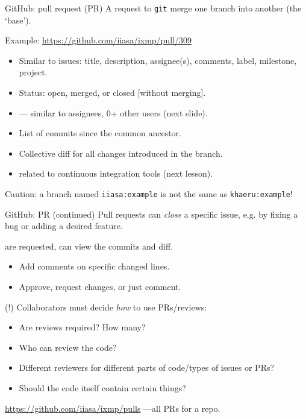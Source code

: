 \documentclass[12pt,aspectratio=169]{beamer}
\begin{document}
\begin{frame}{GitHub: pull request (PR)}
A request to \texttt{git} merge one branch into another (the ‘base’).

\bigskip
Example: \url{https://github.com/iiasa/ixmp/pull/309}

\bigskip
\begin{itemize}
  \item Similar to issues: title, description, assignee(s), comments, label, milestone, project.
  \item Status: open, merged, or closed [without merging].
  \item {} — similar to assignees, 0+ other users (next slide).
  \item List of commits since the common ancestor.
  \item Collective diff for all changes introduced in the branch.
  \item {} related to continuous integration tools (next lesson).
\end{itemize}

\alert{Caution:} a branch named \texttt{iiasa:example} is not the same as
\texttt{khaeru:example}!

\end{frame}

\begin{frame}{GitHub: PR (continued)}
Pull requests can \emph{close} a specific issue, e.g. by fixing a bug or adding a desired feature.

\bigskip
{} are requested, can view the commits and diff.
\begin{itemize}
  \item Add comments on specific changed lines.
  \item Approve, request changes, or just comment.
\end{itemize}

\bigskip
\alert{(!)} Collaborators must decide \emph{how} to use PRs/reviews:

\begin{itemize}
  \item Are reviews required? How many?
  \item Who can review the code?
  \item Different reviewers for different parts of code/types of issues or PRs?
  \item Should the code itself contain certain things?
\end{itemize}

\smallskip
\hspace{2em} \url{https://github.com/iiasa/ixmp/pulls} —all PRs for a repo.

\end{frame}
\end{document}

